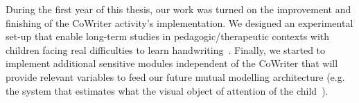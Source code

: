 \documentclass[10pt,a4paper]{article}
\begin{document}
During the first year of this thesis, our work was turned on the improvement and finishing of the CoWriter activity's implementation. We designed an experimental set-up that enable long-term studies in pedagogic/therapeutic contexts with children facing real difficulties to learn handwriting~\cite{jacq2016building}. Finally, we started to implement additional sensitive modules independent of the CoWriter that will provide relevant variables to feed our future mutual modelling architecture (e.g. the system that estimates what the visual object of attention of the child~\cite{lemaignan2016realtime}).



\small
 
\end{document}
